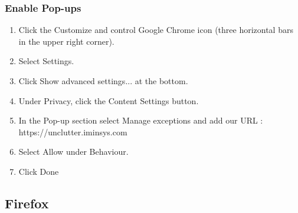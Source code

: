 \documentclass[hidelinks,english]{article}
\begin{document}
            \subsubsection{Enable Pop-ups}
            \begin{enumerate}
                \item Click the Customize and control Google Chrome icon (three horizontal bars in the upper right corner).
                \item Select Settings.
                \item Click Show advanced settings... at the bottom.
                \item Under Privacy, click the Content Settings button.
                \item In the Pop-up section select Manage exceptions and add our URL : https://unclutter.iminsys.com
                \item Select Allow under Behaviour.
                \item Click Done
            \end{enumerate}
            \begin{center}
           \end{center}
            
        \newpage
        \subsection{Firefox}
\end{document}
